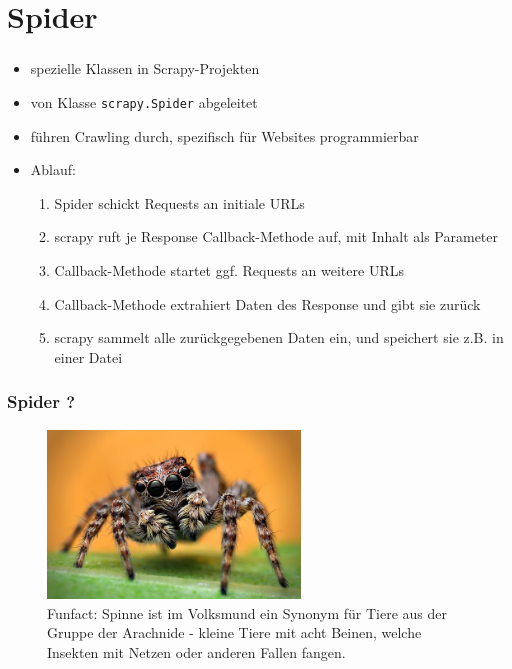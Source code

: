 \documentclass{beamer}
\begin{document}
\section{Spider}
\begin{frame}[fragile]
	\frametitle{\insertsection}
	\begin{itemize}
		\item spezielle Klassen in Scrapy-Projekten
		\item von Klasse \verb|scrapy.Spider| abgeleitet
		\item führen Crawling durch, spezifisch für Websites programmierbar
		\item Ablauf: \begin{enumerate}		
			\item Spider schickt Requests an initiale URLs
			\item scrapy ruft je Response Callback-Methode auf, mit Inhalt als Parameter
			\item Callback-Methode startet ggf. Requests an weitere URLs
			\item Callback-Methode extrahiert Daten des Response und gibt sie zurück
			\item scrapy sammelt alle zurückgegebenen Daten ein, und speichert sie z.B. in einer Datei
		\end{enumerate}
	\end{itemize}
\end{frame}

\begin{frame}[fragile]
	\frametitle{Spider ?}	
	\begin{figure}
		\begin{center}
			\includegraphics[width=0.6\textwidth]{texsrc/Spider_cute}
		\end{center}
		\caption{Funfact: Spinne ist im Volksmund ein Synonym für Tiere aus der Gruppe
		der Arachnide - kleine Tiere mit acht Beinen, welche Insekten mit Netzen oder
		anderen Fallen fangen.}
		\label{fig:Spider}
	\end{figure}
\end{frame}
\end{document}
